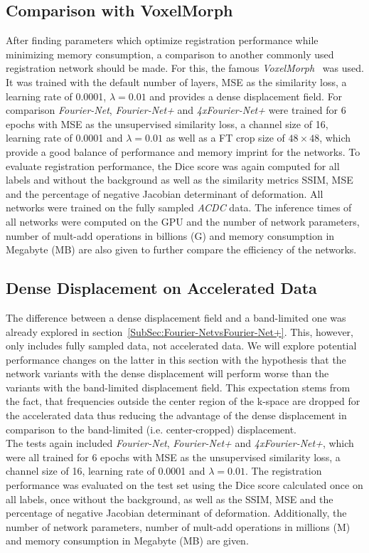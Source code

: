 \documentclass[english,version-2022-01]{uzl-thesis} %
\begin{document}
\subsection{Comparison with VoxelMorph} \label{SubSec:ComparisonVoxelMorph}
After finding parameters which optimize registration performance while minimizing memory consumption, a comparison to another commonly used registration network should be made. For this, the famous \emph{VoxelMorph}~\cite{Voxelmorph} was used. It was trained with the default number of layers, MSE as the similarity loss, a learning rate of 0.0001, $\lambda=0.01$ and provides a dense displacement field. For comparison \emph{Fourier-Net}, \emph{Fourier-Net+} and \emph{4xFourier-Net+} were trained for 6 epochs with MSE as the unsupervised similarity loss, a channel size of 16, learning rate of 0.0001 and $\lambda=0.01$ as well as a FT crop size of $48 \times 48$, which provide a good balance of performance and memory imprint for the networks. To evaluate registration performance, the Dice score was again computed for all labels and without the background as well as the similarity metrics SSIM, MSE and the percentage of negative Jacobian determinant of deformation. All networks were trained on the fully sampled \emph{ACDC} data. The inference times of all networks were computed on the GPU and the number of network parameters, number of mult-add operations in billions (G) and memory consumption in Megabyte (MB) are also given to further compare the efficiency of the networks. 


\subsection{Dense Displacement on Accelerated Data} \label{SubSec:DenseDisplacementAcc}
The difference between a dense displacement field and a band-limited one was already explored in section~\ref{SubSec:Fourier-NetvsFourier-Net+}. This, however, only includes fully sampled data, not accelerated data. We will explore potential performance changes on the latter in this section with the hypothesis that the network variants with the dense displacement will perform worse than the variants with the band-limited displacement field. This expectation stems from the fact, that frequencies outside the center region of the k-space are dropped for the accelerated data thus reducing the advantage of the dense displacement in comparison to the band-limited (i.e. center-cropped) displacement. \\
The tests again included \emph{Fourier-Net}, \emph{Fourier-Net+} and \emph{4xFourier-Net+}, which were all trained for 6 epochs with MSE as the unsupervised similarity loss, a channel size of 16, learning rate of 0.0001 and $\lambda=0.01$. The registration performance was evaluated on the test set using the Dice score calculated once on all labels, once without the background, as well as the SSIM, MSE and the percentage of negative Jacobian determinant of deformation. Additionally, the number of network parameters, number of mult-add operations in millions (M) and memory consumption in Megabyte (MB) are given.
\end{document}
